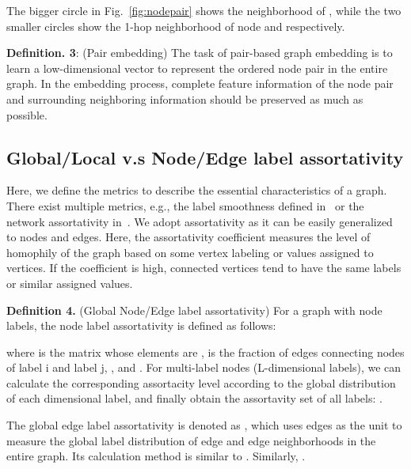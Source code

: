 \documentclass[10pt,journal,compsoc]{IEEEtran}
\begin{document}
    
    
The bigger circle in Fig.~\ref{fig:nodepair} shows the neighborhood of , while the two smaller circles show the 1-hop neighborhood of node  and  respectively. 






\noindent \textbf{Definition. 3}: (Pair embedding)  The task of pair-based graph embedding is to learn a low-dimensional vector  to represent the ordered node pair  in the entire graph. In the embedding process, complete feature information of the node pair and surrounding neighboring information  should be preserved as much as possible.


\subsection{Global/Local v.s Node/Edge label assortativity}

Here, we define the metrics to describe the essential characteristics of a graph. There exist multiple metrics, e.g., the label smoothness defined in~\cite{Hou20Measuring} or the network assortativity in~\cite{Newman2003}. We adopt assortativity as it can be easily generalized to nodes and edges. Here, the assortativity coefficient measures the level of homophily of the graph based on some vertex labeling or values assigned to vertices. If the coefficient is high, connected vertices tend to have the same labels or similar assigned values.




\noindent\textbf{Definition 4.} (Global Node/Edge label assortativity) For a graph  with node labels, the node label assortativity is defined as follows:

    where  is the matrix whose elements are ,  is the fraction of edges connecting nodes of label i and label j, , and . For multi-label nodes (L-dimensional labels), we can calculate the corresponding assortacity level according to the global distribution of each dimensional label, and finally obtain the assortavity set of all labels: .
     
    
  The global edge label assortativity is denoted as   , which uses edges as the unit to measure the global label distribution of edge and edge neighborhoods in the entire graph. Its calculation method is similar to . Similarly, .
    

    
\end{document}
